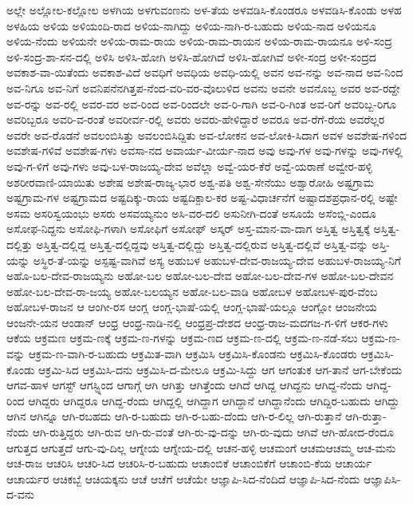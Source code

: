 {ಅಲ್ಲೇ
ಅಲ್ಲೋಲ-ಕಲ್ಲೋಲ
ಅಳಗಿಯ
ಅಳಗುವಂಣನು
ಅಳ-ತೆಯ
ಅಳವಡಿಸಿ-ಕೊಂಡರೂ
ಅಳವಡಿಸಿ-ಕೊಂಡು
ಅಳಹ
ಅಳಹಿಯ
ಅಳಿಯ
ಅಳಿಯಂದಿ-ರಾದ
ಅಳಿಯ-ನಾಗಿದ್ದು
ಅಳಿಯ-ನಾಗಿ-ರ-ಬಹುದು
ಅಳಿಯ-ನಾದ
ಅಳಿಯನೂ
ಅಳಿಯ-ನೆಂದು
ಅಳಿಯನೇ
ಅಳಿಯ-ರಾಮ-ರಾಯ
ಅಳಿಯ-ರಾಮ-ರಾಯನ
ಅಳಿಯ-ರಾಮ-ರಾಯನೂ
ಅಳಿ-ಸಂದ್ರ
ಅಳಿ-ಸಂದ್ರ-ಶಾ-ಸನ-ದಲ್ಲಿ
ಅಳಿಸಿ
ಅಳಿಸಿ-ಹೋಗಿ
ಅಳಿಸಿ-ಹೋಗಿದೆ
ಅಳಿಸಿ-ಹೋಗಿವೆ
ಅಳೀ-ಸಂದ್ರ
ಅಳೀ-ಸಂದ್ರದ
ಅವಕಾಶ-ವಾ-ಯಿತೆಂದು
ಅವಕಾಶ-ವಿದೆ
ಅವಧಿಗೆ
ಅವಧಿಯ
ಅವಧಿ-ಯಲ್ಲಿ
ಅವನ
ಅವ-ನನ್ನು
ಅವ-ನಾದ
ಅವ-ನಿಂದ
ಅವ-ನಿಗೂ
ಅವ-ನಿಗೆ
ಅವನಿಪನೆನಗಿತ್ತಪ-ನೆಂದ-ವರಿ-ವರ-ವೊಲುಳಿದ
ಅವನು
ಅವನೇ
ಅವನೊಬ್ಬ
ಅವರ
ಅವ-ರದ್ದೇ
ಅವ-ರನ್ನು
ಅವ-ರಲ್ಲಿ
ಅವರ-ವರ
ಅವ-ರಿಂದ
ಅವ-ರಿಂದಲೇ
ಅವ-ರಿ-ಗಾಗಿ
ಅವ-ರಿ-ಗಿಂತ
ಅವ-ರಿಗೆ
ಅವರಿಬ್ಬ-ರಿಗೂ
ಅವರಿಬ್ಬರೂ
ಅವರಿ-ವ-ರಂತೆ
ಅವರೀರ್ವ-ರಲ್ಲಿ
ಅವರು
ಅವರು-ಹೇಳಿದ್ದಾರೆ
ಅವರೂ
ಅವ-ರೆಗೆ-ರೆಯ
ಅವರೆಲ್ಲರ
ಅವರೇ
ಅವ-ರೊಡನೆ
ಅವಲಂಬಿಸಿತ್ತು
ಅವಲಂಬಿಸಿದ್ದಿತು
ಅವ-ಲೋಕನ
ಅವ-ಲೋಕಿ-ಸಿದಾಗ
ಅವಳ
ಅವಶೇಷ-ಗಳಿಂದ
ಅವಶೇಷ-ಗಳಿವೆ
ಅವಶೇಷ-ಗಳು
ಅವಸಾ-ನದ
ಅವಾರ್ಯ-ವೀರ್ಯ-ನಾದ
ಅವು
ಅವು-ಗಳ
ಅವು-ಗಳನ್ನು
ಅವು-ಗಳಲ್ಲಿ
ಅವು-ಗ-ಳಿಗೆ
ಅವು-ಗಳು
ಅವು-ಬಳ-ರಾಜಯ್ಯ-ದೇವ
ಅವೆಲ್ಲಾ
ಅವ್ವೆ-ಯರ-ಕೆರೆ
ಅವ್ವೆ-ಯರಾಣೆ
ಅವ್ವೇರ-ಹಳ್ಳಿ
ಅಶರೀರವಾಣಿ-ಯಾಯಿತು
ಅಶೇಷ
ಅಶೇಷ-ರಾಜ್ಯ-ಭಾರ
ಅಶ್ವ-ಪತಿ
ಅಶ್ವ-ಸೇನೆಯು
ಅಶ್ವಾರೋಹಿ
ಅಷ್ಟಗ್ರಾಮ
ಅಷ್ಟಗ್ರಾಮ-ಗಳ
ಅಷ್ಟಗ್ರಾಮದ
ಅಷ್ಟದಿಕ್ಕು-ರಾಯ
ಅಷ್ಟದಿಕ್ಪಾಲ-ಕರ
ಅಷ್ಟ-ವಿಧಾರ್ಚನೆಗೆ
ಅಷ್ಟಾದಶಪ್ರಧಾನ-ರಲ್ಲಿ
ಅಷ್ಟೇ
ಅಸಮ
ಅಸರಿಸ್ವಯಂಭು
ಅಸರು
ಅಸವಯ್ಯನುಂ
ಅಸಿ-ವರ-ದಲಿ
ಅಸುನೀಗಿ-ದಂತೆ
ಅಸೂಯೆ
ಅಸೆಂಬ್ಲಿ-ಎಂದೂ
ಅಸೋಫ-ನಿದ್ದನು
ಅಸೋಫಿ-ಗಳಾಗಿ
ಅಸೋಫಿಗೆ
ಅಸೋಫ್
ಅಸ್ಕರ್
ಅಸ್ತ-ಮಾನ-ವಾ-ದಾಗ
ಅಸ್ತಿತ್ವ
ಅಸ್ತಿತ್ವಕ್ಕೆ
ಅಸ್ತಿತ್ವ-ದಲ್ಲಿತ್ತು
ಅಸ್ತಿತ್ವ-ದಲ್ಲಿದ್ದ
ಅಸ್ತಿತ್ವ-ದಲ್ಲಿದ್ದವು
ಅಸ್ತಿತ್ವ-ದಲ್ಲಿದ್ದು
ಅಸ್ತಿತ್ವ-ದಲ್ಲಿರುವ
ಅಸ್ತಿತ್ವ-ದಲ್ಲಿವೆ
ಅಸ್ತಿತ್ವ-ವನ್ನು
ಅಸ್ತಿ-ಯನ್ನು
ಅಸ್ಥಿರ-ತೆ-ಯನ್ನು
ಅಸ್ಪಷ್ಟ-ವಾಗಿವೆ
ಅಸ್ಯ
ಅಹುಬಳ
ಅಹುಬಳ-ದೇವ-ರಾಜಯ್ಯ-ದೇವ
ಅಹುಬಳ-ರಾಜಯ್ಯ-ನಿಗೆ
ಅಹೊ-ಬಲ-ದೇವ-ರಾಜಯ್ಯನು
ಅಹೋ-ಬಲ
ಅಹೋ-ಬಲ-ದೇವ
ಅಹೋ-ಬಲ-ದೇವ-ಗಳ
ಅಹೋ-ಬಲ-ದೇವನ
ಅಹೋ-ಬಲ-ದೇವ-ರಾ-ಜಯ್ಯ
ಅಹೋ-ಬಲಯ್ಯನ
ಅಹೋ-ಬಲ-ವಾಡಿ
ಅಹೋಬಳ
ಅಹೋಬಳ-ಪುರ-ವೆಂಬ
ಅಹೋಬಳ-ರಾಜನ
ಆ
ಆಂಗೀ-ರಸ
ಆಂಗ್ಲ
ಆಂಗ್ಲ-ಭಾಷೆ-ಯಲ್ಲಿ
ಆಂಗ್ಲ-ಭಾಷೆ-ಯಲ್ಲೂ
ಆಂಗ್ಲೋ
ಆಂಜನೇಯ
ಆಂಜನೇ-ಯನ
ಆಂಡಾನ್
ಆಂಧ್ರ
ಆಂಧ್ರ-ನಾಡಿ-ನಲ್ಲಿ
ಆಂಧ್ರಪ್ರ-ದೇಶದ
ಆಂಧ್ರ-ರಾಜ-ಮದಗಜ-ಗ-ಳಿಗೆ
ಆಕರ-ಗಳು
ಆಕೆಯ
ಆಕ್ರಮಣ
ಆಕ್ರಮ-ಣಕ್ಕೆ
ಆಕ್ರಮ-ಣ-ಗಳನ್ನು
ಆಕ್ರಮ-ಣದ
ಆಕ್ರಮ-ಣ-ದಲ್ಲಿ
ಆಕ್ರಮ-ಣ-ನಡೆ-ಸಲು
ಆಕ್ರಮ-ಣ-ವನ್ನು
ಆಕ್ರಮ-ಣ-ವಾಗಿ-ರ-ಬಹುದು
ಆಕ್ರಮಿತ-ವಾಗಿ
ಆಕ್ರಮಿಸಿ
ಆಕ್ರಮಿಸಿ-ಕೊಂಡನು
ಆಕ್ರಮಿಸಿ-ಕೊಂಡರು
ಆಕ್ರಮಿಸಿ-ಕೊಂಡು
ಆಕ್ರಮಿ-ಸಿದ
ಆಕ್ರಮಿಸಿ-ದನು
ಆಕ್ರಮಿಸಿ-ದ-ಮೇಲೂ
ಆಕ್ರಮಿ-ಸಿದ್ದು
ಆಗ
ಆಗಂತುಕ
ಆಗ-ತಾನೆ
ಆಗ-ಬೇಕೆಂದು
ಆಗವ-ಹಾಳ
ಆಗಸ್ಟ್
ಆಗಸ್ಟ್ನಿಂದ
ಆಗಾಗ್ಗೆ
ಆಗಿ
ಆಗಿತ್ತು
ಆಗಿತ್ತೆಂದು
ಆಗಿದೆ
ಆಗಿದ್ದ
ಆಗಿದ್ದನು
ಆಗಿದ್ದ-ನೆಂದು
ಆಗಿದ್ದ-ರಿಂದ
ಆಗಿದ್ದರು
ಆಗಿದ್ದರೂ
ಆಗಿದ್ದ-ರೆಂದು
ಆಗಿದ್ದಲ್ಲಿ
ಆಗಿದ್ದಾಗ
ಆಗಿದ್ದಾನೆ
ಆಗಿದ್ದಾನೆಂದು
ಆಗಿದ್ದಿರ-ಬಹುದು
ಆಗಿದ್ದು
ಆಗಿನ
ಆಗಿನ್ನೂ
ಆಗಿ-ರಬಹದು
ಆಗಿ-ರ-ಬಹುದು
ಆಗಿ-ರ-ಬಹು-ದೆಂದು
ಆಗಿ-ರ-ಲಿಲ್ಲ
ಆಗಿ-ರುತ್ತಾನೆ
ಆಗಿ-ರುತ್ತಾ-ನೆಂದು
ಆಗಿ-ರುತ್ತಿದ್ದರು
ಆಗಿ-ರುವ
ಆಗಿ-ರು-ವಂತೆ
ಆಗಿ-ರು-ವು-ದನ್ನು
ಆಗಿ-ರು-ವುದು
ಆಗಿವೆ
ಆಗಿ-ಹೋದ-ರೆಂದೂ
ಆಗುತ್ತದ
ಆಗುತ್ತದೆ
ಆಗು-ವು-ದಿಲ್ಲ
ಆಗ್ನೇಯ
ಆಗ್ನೇಯ-ದಲ್ಲಿ
ಆಚನ-ಹಳ್ಳಿ
ಆಚಮಂಗೆ
ಆಚಮಆಚಮ್ಮ
ಆಚ-ಮನು
ಆಚ-ರಾಜ
ಆಚರಿಸಿ
ಆಚರಿ-ಸಿದ
ಆಚರಿಸಿ-ರ-ಬಹುದು
ಆಚಾಂಬಿಕೆ
ಆಚಾಂಬಿಕೆಗೆ
ಆಚಾಂಬಿ-ಕೆಯ
ಆಚಾರ್ಯ
ಆಚಾರ್ಯರ
ಆಚಿಕಬ್ಬೆ
ಆಚಿಯಕ್ಕನು
ಆಚೆ
ಆಚೆಗೆ
ಆಚೆಯೇ
ಆಜ್ಞಾಪಿ-ಸಿದ-ನೆಂದಿದೆ
ಆಜ್ಞಾಪಿ-ಸಿದ-ನೆಂದು
ಆಜ್ಞಾಪಿಸಿ-ದ-ವನು
}
